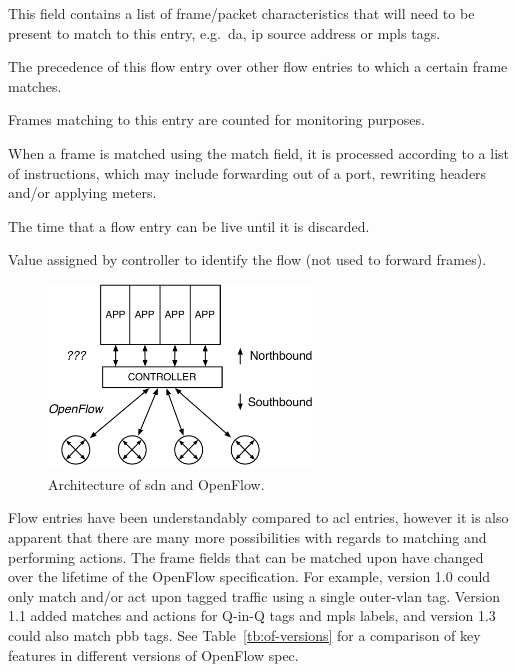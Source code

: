 \begin{description}[leftmargin=!,labelwidth=\widthof{\bfseries Instructions}]
	\item[Match] This field contains a list of frame/packet characteristics that will need to be present to match to this entry, e.g.\ \ac{da}, \ac{ip} source address or \ac{mpls} tags.
	\item[Priority] The precedence of this flow entry over other flow entries to which a certain frame matches.
	\item[Counters] Frames matching to this entry are counted for monitoring purposes.
	\item[Instructions] When a frame is matched using the match field, it is processed according to a list of instructions, which may include forwarding out of a port, rewriting headers and/or applying meters.
	\item[Timeouts] The time that a flow entry can be live until it is discarded.
	\item[Cookie] Value assigned by controller to identify the flow (not used to forward frames).
\end{description}

\begin{figure}[!h]
	\centering
	\includegraphics[width=7cm]{./includes/of-arch.pdf}
	\caption{Architecture of \ac{sdn} and OpenFlow.}
	\label{fig:of-arch}
\end{figure}

Flow entries have been understandably compared to \acs{acl} entries, however it is also apparent that there are many more possibilities with regards to matching and performing actions. The frame fields that can be matched upon have changed over the lifetime of the OpenFlow specification. For example, version 1.0 could only match and/or act upon tagged traffic using a single outer-\acs{vlan} tag. Version 1.1 added matches and actions for Q-in-Q tags and \ac{mpls} labels, and version 1.3 could also match \ac{pbb} tags. See Table~\ref{tb:of-versions} for a comparison of key features in different versions of OpenFlow spec. 

